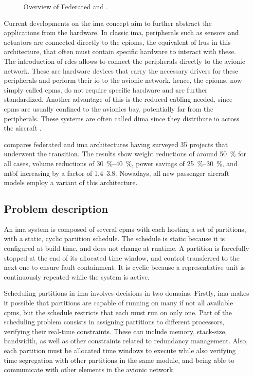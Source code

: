 \documentclass[main.tex]{subfiles}
\begin{document}
\begin{figure}[htbp]
    \centering
    \resizebox{\linewidth}{!}{}
    \caption{Overview of Federated and .}
    \label{fig:ima-federated}
\end{figure}

Current developments on the \gls{ima} concept aim to further abstract the applications from the hardware.
In classic \gls{ima}, peripherals such as sensors and actuators are connected directly to the \glspl{cpiom}, the equivalent of \glspl{lru} in this architecture, that often must contain specific hardware to interact with these.
The introduction of \glspl{rdc} allows to connect the peripherals directly to the avionic network.
These are hardware devices that carry the necessary drivers for these peripherals and perform their \gls{io} to the avionic network, hence, the \glspl{cpiom}, now simply called \glspl{cpm}, do not require specific hardware and are further standardized.
Another advantage of this is the reduced cabling needed, since \glspl{cpm} are usually confined to the avionics bay, potentially far from the peripherals.
These systems are often called \gls{dima} since they distribute \gls{io} across the aircraft \cite{barros}.

\Textcite{mairaj2015preferred} compares federated and \gls{ima} architectures having surveyed 35 projects that underwent the transition.
The results show weight reductions of around \SI{50}{\percent} for all cases, volume reductions of \SIrange{30}{40}{\percent}, power savings of \SIrange{25}{30}{\percent}, and \gls{mtbf} increasing by a factor of \numrange{1.4}{3.8}.
Nowadays, all new passenger aircraft models employ a variant of this architecture.

\subsection{Problem description}

An \gls{ima} system is composed of several \glspl{cpm} with each hosting a set of partitions, with a static, cyclic partition schedule.
The schedule is static because it is configured at build time, and does not change at runtime.
A partition is forcefully stopped at the end of its allocated time window, and control transferred to the next one to ensure fault containment.
It is cyclic because a representative unit is continuously repeated while the system is active.

Scheduling partitions in \gls{ima} involves decisions in two domains.
Firstly, \gls{ima} makes it possible that partitions are capable of running on many if not all available \glspl{cpm}, but the schedule restricts that each must run on only one.
Part of the scheduling problem consists in assigning partitions to different processors, verifying their real-time constraints.
These can include memory, stack-size, bandwidth, as well as other constraints related to redundancy management.
Also, each partition must be allocated time windows to execute while also verifying time segregation with other partitions in the same module, and being able to communicate with other elements in the avionic network.
\end{document}
